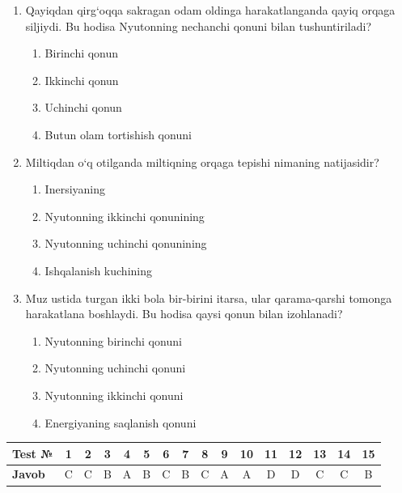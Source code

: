 \begin{enumerate}
\begin{enumerate}[label=\Alph*)]
\item 100; 50
\item 10; 10
\item 100; 200
\item 100; 100
\end{enumerate}

\item Qayiqdan qirg‘oqqa sakragan odam oldinga harakatlanganda qayiq orqaga siljiydi. Bu hodisa Nyutonning nechanchi qonuni bilan tushuntiriladi?
\begin{enumerate}[label=\Alph*)]
\item Birinchi qonun
\item Ikkinchi qonun
\item Uchinchi qonun
\item Butun olam tortishish qonuni
\end{enumerate}

\item Miltiqdan o‘q otilganda miltiqning orqaga tepishi nimaning natijasidir?
\begin{enumerate}[label=\Alph*)]
\item Inersiyaning
\item Nyutonning ikkinchi qonunining
\item Nyutonning uchinchi qonunining
\item Ishqalanish kuchining

\end{enumerate}

\item Muz ustida turgan ikki bola bir-birini itarsa, ular qarama-qarshi tomonga harakatlana boshlaydi. Bu hodisa qaysi qonun bilan izohlanadi?
\begin{enumerate}[label=\Alph*)]
\item Nyutonning birinchi qonuni
\item Nyutonning uchinchi qonuni
\item Nyutonning ikkinchi qonuni
\item Energiyaning saqlanish qonuni
\end{enumerate}


\end{enumerate}


\begin{table}[h!]
\centering
\begin{tabular}{|l|c|c|c|c|c|c|c|c|c|c|c|c|c|c|c|}
\hline
\textbf{Test №} & 1 & 2 & 3 & 4 & 5 & 6 & 7 & 8 & 9 & 10 & 11 & 12&13&14&15 \\ \hline
\textbf{Javob}  & C & C & B & A & B & C & B & C & A & A & D & D&C&C&B \\ \hline
\end{tabular}
\end{table}